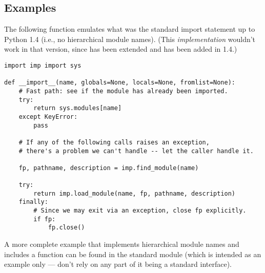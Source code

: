 \subsection{Examples}
\label{examples-imp}

The following function emulates what was the standard import statement
up to Python 1.4 (i.e., no hierarchical module names).  (This
\emph{implementation} wouldn't work in that version, since
 has been extended and
 has been added in 1.4.)

\begin{verbatim}
import imp import sys

def __import__(name, globals=None, locals=None, fromlist=None):
    # Fast path: see if the module has already been imported.
    try:
        return sys.modules[name]
    except KeyError:
        pass

    # If any of the following calls raises an exception,
    # there's a problem we can't handle -- let the caller handle it.

    fp, pathname, description = imp.find_module(name)
    
    try:
        return imp.load_module(name, fp, pathname, description)
    finally:
        # Since we may exit via an exception, close fp explicitly.
        if fp:
            fp.close()
\end{verbatim}

A more complete example that implements hierarchical module names and
includes a  function can be
found in the standard module  (which
is intended as an example only --- don't rely on any part of it being
a standard interface).
